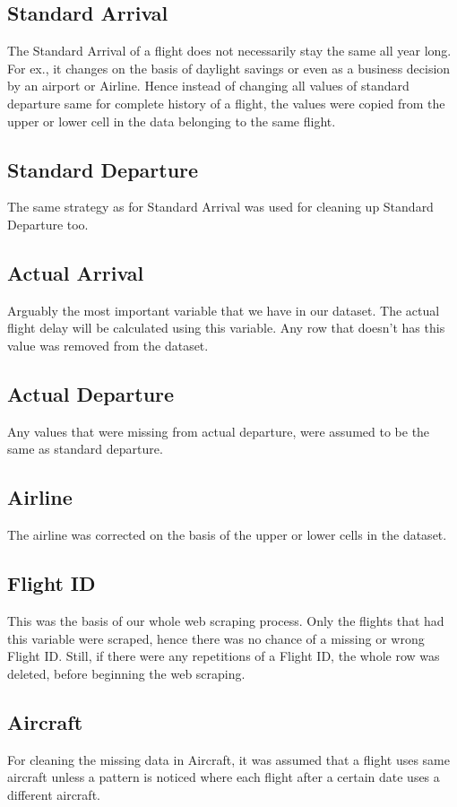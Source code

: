 \subsection{Standard Arrival}
The Standard Arrival of a flight does not necessarily stay the same all year long. For ex., it changes on the basis of daylight savings or even as a business decision by an airport or Airline. Hence instead of changing all values of standard departure same for complete history of a flight, the values were copied from the upper or lower cell in the data belonging to the same flight. 

\subsection{Standard Departure}
The same strategy as for Standard Arrival was used for cleaning up Standard Departure too.

\subsection{Actual Arrival}
Arguably the most important variable that we have in our dataset. The actual flight delay will be calculated using this variable. Any row that doesn't has this value was removed from the dataset.

\subsection{Actual Departure}
Any values that were missing from actual departure, were assumed to be the same as standard departure.

\subsection{Airline}
The airline was corrected on the basis of the upper or lower cells in the dataset. 

\subsection{Flight ID}
This was the basis of our whole web scraping process. Only the flights that had this variable were scraped, hence there was no chance of a missing or wrong Flight ID. Still, if there were any repetitions of a Flight ID, the whole row was deleted, before beginning the web scraping.

\subsection{Aircraft}
For cleaning the missing data in Aircraft, it was assumed that a flight uses same aircraft unless a pattern is noticed where each flight after a certain date uses a different aircraft.

